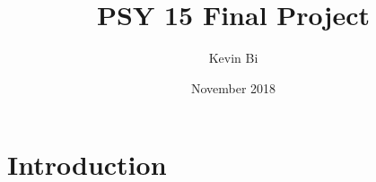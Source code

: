 \documentclass{article}
\title{PSY 15 Final Project}
\author{Kevin Bi}
\date{November 2018}
\begin{document}
\maketitle

\section{Introduction}
\end{document}
